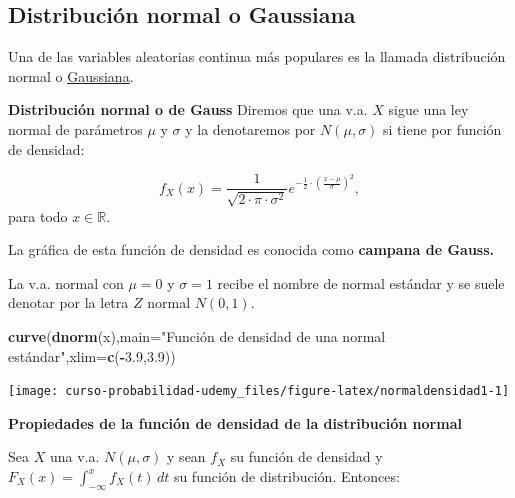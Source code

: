 \documentclass[]{book}
\newenvironment{Shaded}{\begin{snugshade}}{\end{snugshade}}
\newcommand{\DataTypeTok}[1]{\textcolor[rgb]{0.13,0.29,0.53}{#1}}
\newcommand{\FloatTok}[1]{\textcolor[rgb]{0.00,0.00,0.81}{#1}}
\newcommand{\KeywordTok}[1]{\textcolor[rgb]{0.13,0.29,0.53}{\textbf{#1}}}
\newcommand{\NormalTok}[1]{#1}
\newcommand{\OperatorTok}[1]{\textcolor[rgb]{0.81,0.36,0.00}{\textbf{#1}}}
\newcommand{\StringTok}[1]{\textcolor[rgb]{0.31,0.60,0.02}{#1}}
\begin{document}
\hypertarget{distribuciuxf3n-normal-o-gaussiana}{%
\subsection{Distribución normal o Gaussiana}\label{distribuciuxf3n-normal-o-gaussiana}}

Una de las variables aleatorias continua más populares es la llamada distribución normal o \href{https://es.wikipedia.org/wiki/Distribuci\%C3\%B3n_normal}{Gaussiana}.

\textbf{Distribución normal o de Gauss}
Diremos que una v.a. \(X\) sigue una ley normal de parámetros
\(\mu\) y \(\sigma\) y la denotaremos por \(N(\mu,\sigma)\)
si tiene por función de densidad:

\[
f_{X}(x)=\frac1{\sqrt{2\cdot\pi\cdot\sigma^2}}
e^{-\frac{1}{2}\cdot\left(\frac{x-\mu}{\sigma}\right)^2},
\]
para todo \(x\in \mathbb{R}.\)

La gráfica de esta función de densidad es conocida como \textbf{campana de Gauss.}

La v.a. normal con \(\mu=0\) y \(\sigma=1\) recibe el nombre de
normal estándar y se suele denotar por la letra \(Z\) normal \(N(0,1)\).

\begin{Shaded}
\begin{Highlighting}[]
\KeywordTok{curve}\NormalTok{(}\KeywordTok{dnorm}\NormalTok{(x),}\DataTypeTok{main=}\StringTok{"Función de densidad de una normal estándar"}\NormalTok{,}\DataTypeTok{xlim=}\KeywordTok{c}\NormalTok{(}\OperatorTok{-}\FloatTok{3.9}\NormalTok{,}\FloatTok{3.9}\NormalTok{))}
\end{Highlighting}
\end{Shaded}

\begin{center}\texttt{[image: curso-probabilidad-udemy\_files/figure-latex/normaldensidad1-1]} \end{center}

\textbf{Propiedades de la función de densidad de la distribución normal}

Sea \(X\) una v.a. \(N(\mu,\sigma)\) y sean \(f_{X}\) su función de densidad y \(F_X(x)=\displaystyle\int_{-\infty}^x f_X(t)\, dt\) su función de distribución. Entonces:
\end{document}
